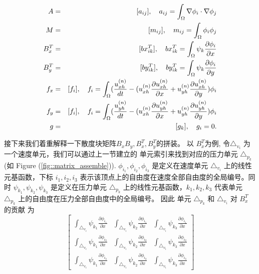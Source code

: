 \documentclass{report}
\theoremstyle{Remark}
\begin{document}
   \begin{eqnarray}
     A & = & [a_{ij}], \quad a_{ij} = \int_\Omega \nabla \phi_i \cdot \nabla
     \phi_j  \notag \\
     M & = & [m_{ij}], \quad m_{ij} = \int_{\Omega}\phi_i \phi_j \notag \\
     B_x^T & = & [bx^T_{ik}], \quad bx^T_{ik} = \int_{\Omega} \psi_k
     \frac{\partial{\phi_i}}{\partial x}  \notag \\
     B_y^T & = & [by^T_{ik}], \quad by^T_{ik} = \int_{\Omega} \psi_k
     \frac{\partial {\phi_i}}{\partial y}  \notag \\
     f_x & = & [f_i], \quad f_i = \int_\Omega (\frac{u_{xh}^{(n)}}{dt} - (u_{xh}^{(n)}
     \frac{\partial u_{xh}^{(n)}}{\partial x} + u_{yh}^{(n)} \frac{\partial
       u_{xh}^{(n)}}{\partial y}) \phi_i \notag \\
     f_y & = & [f_i], \quad f_i = \int_\Omega (\frac{u_{yh}^{(n)}}{dt} - (u_{xh}^{(n)}
     \frac{\partial u_{yh}^{(n)}}{\partial x} + u_{yh}^{(n)} \frac{\partial
       u_{yh}^{(n)}}{\partial y}) \phi_i \notag \\
     g & = &  [g_k],\quad  g_i = 0. \notag
   \end{eqnarray}
   
   接下来我们着重解释一下散度块矩阵$B_x B_y, B_x^T, B_y^T$的拼装。 以
   $B_x^T$为例, 令$\triangle_{v_i}$ 为一个速度单元，我们可以通过上一节建立的
   单元索引来找到对应的压力单元 $\triangle_{p_k}$(如 Figure
   (\ref{fig::matrix_assemble})). $\phi_{i_1}, \phi_{i_2}, \phi_{i_3}$
   是定义在速度单元 $\triangle_{v_i}$ 上的线性元基函数，下标 $i_1,
   i_2, i_3$ 表示该顶点上的自由度在速度全部自由度的全局编号。同时
   $\psi_{k_1}, \psi_{k_2}, \psi_{k_3}$ 是定义在压力单元
   $\triangle_{p_k}$ 上的线性元基函数，$k_1, k_2, k_3$ 代表单元
   $\triangle_{p_k}$ 上的自由度在压力全部自由度中的全局编号。 
   因此 单元 $\triangle_{p_k}$ 和 $\triangle_{v_i}$ 对 $B_x^T$ 的贡献
   为
   \begin{equation}
     \left[
     \begin{array}{lll}
       \int_{\triangle_{v_i}}\psi_{k_1} \frac{\partial
         \phi_{i_1}}{\partial x} & \int_{\triangle_{v_i}} \psi_{k_2}
       \frac{\partial \phi_{i_1}}{\partial x} & \int_{\triangle_{v_i}}
       \psi_{k_3} \frac{\partial \phi_{i_1}}{\partial x} \\
       \int_{\triangle_{v_i}} \psi_{k_1} \frac{\partial
         \phi_{i_2}}{\partial x} & \int_{\triangle_{v_i}} \psi_{k_2}
       \frac{\partial \phi_{i_2}}{\partial x} & \int_{\triangle_{v_i}}
       \psi_{k_3} \frac{\partial \phi_{i_2}}{\partial x} \\
       \int_{\triangle_{v_i}} \psi_{k_1} \frac{\partial
         \phi_{i_3}}{\partial x} & \int_{\triangle_{v_i}} \psi_{k_2}
       \frac{\partial \phi_{i_3}}{\partial x} & \int_{\triangle_{v_i}}
       \psi_{k_3} \frac{\partial \phi_{i_3}}{\partial x}
     \end{array}
   \right]
   \label{eq::element_matrix}
   \end{equation}
\end{document}
